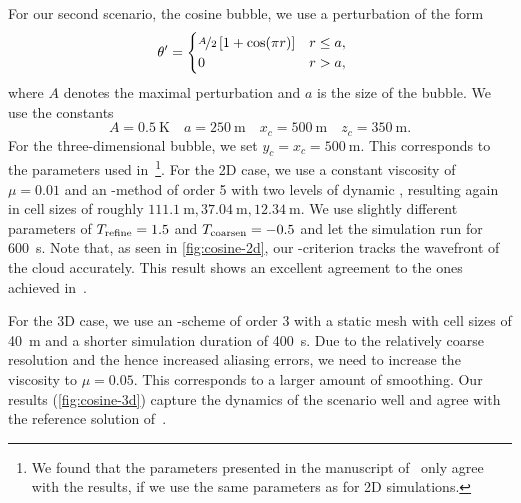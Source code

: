 \documentclass[runningheads]{llncs}
\begin{document}
For our second scenario, the cosine bubble, we use a perturbation of the form
\begin{align}
  \label{eq:cos-pertubation}
  \theta' &= \begin{cases}
    \nicefrac{A}{2} \left[ 1 + \cos(\pi r) \right] & r \leq a, \\
    0 & r > a,
    \end{cases}
\end{align}
where $A$ denotes the maximal perturbation and $a$ is the size of the bubble.
We use the constants
\begin{equation}\label{eq:cosine-bubble}
  A = \SI{0.5}{\K} \quad a = \SI{250}{\m} \quad x_c = \SI{500}{\m} \quad z_c = \SI{350}{\m}.
\end{equation}
For the three-dimensional bubble, we set $y_c = x_c = \SI{500}{\m}$.
This corresponds to the parameters used in~\cite{kelly2012continuous}\footnote{%
We found that the parameters presented in the manuscript of~\cite{kelly2012continuous} only agree with the results, if we use the same parameters as for 2D simulations.}.
For the 2D case, we use a constant viscosity of $\mu = 0.01$ and an \aderdg{}-method of order 5 with two levels of dynamic \amr{}, resulting again in cell sizes of roughly $\SI{111.1}{\m}, \SI{37.04}{\m}, \SI{12.34}{\m}$.
We use slightly different \amr{} parameters of $T_\text{refine} = 1.5$ and $T_\text{coarsen} = -0.5$ and let the simulation run for \SI{600}{\s}.
Note that, as seen in \cref{fig:cosine-2d}, our \amr{}-criterion tracks the wavefront of the cloud accurately.
This result shows an excellent agreement to the ones achieved in~\cite{giraldo2008study,muller2010adaptive}.

For the 3D case, we use an \aderdg{}-scheme of order 3 with a static mesh with cell sizes of \SI{40}{\m} and a shorter simulation duration of \SI{400}{\s}.
Due to the relatively coarse resolution and the hence increased aliasing errors, we need to increase the viscosity to $\mu = 0.05$.
This corresponds to a larger amount of smoothing.
Our results (\cref{fig:cosine-3d}) capture the dynamics of the scenario well and agree with the reference solution of~\cite{kelly2012continuous}.
\end{document}
